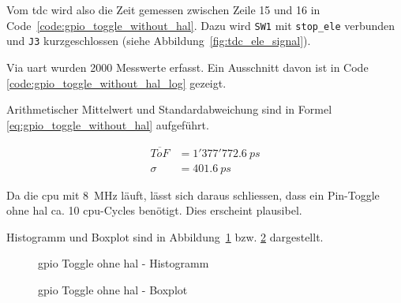 \documentclass[11pt,a4paper,hidelinks]{article}
\begin{document}


Vom \acrshort{tdc} wird also die Zeit gemessen zwischen Zeile 15 und 16 in Code~\ref{code:gpio_toggle_without_hal}. Dazu
wird \lstinline|SW1| mit \lstinline|stop_ele| verbunden und \lstinline|J3| kurzgeschlossen
(siehe Abbildung~\ref{fig:tdc_ele_signal}).

Via \acrshort{uart} wurden 2000 Messwerte erfasst. Ein Ausschnitt davon ist in Code
\ref{code:gpio_toggle_without_hal_log} gezeigt.



Arithmetischer Mittelwert und Standardabweichung sind in Formel \ref{eq:gpio_toggle_without_hal} aufgeführt.

\begin{equation}\label{eq:gpio_toggle_without_hal}
    \begin{split}
        \overline{ToF} &= 1'377'772.6~ps\\
        \sigma         &= 401.6~ps
    \end{split}
\end{equation}

Da die \acrshort{cpu} mit 8~MHz läuft, lässt sich daraus schliessen, dass ein Pin-Toggle ohne \acrshort{hal} ca. 10
\acrshort{cpu}-Cycles benötigt. Dies erscheint plausibel.

Histogramm und Boxplot sind in Abbildung~\ref{fig:gpio_toggle_without_hal_histogram} bzw.
\ref{fig:gpio_toggle_without_hal_boxplot} dargestellt.

\begin{figure}[H]
    \centering
    
    \caption{\acrshort{gpio} Toggle ohne \acrshort{hal} - Histogramm}\label{fig:gpio_toggle_without_hal_histogram}
\end{figure}

\begin{figure}[H]
    \centering
    
    \caption{\acrshort{gpio} Toggle ohne \acrshort{hal} - Boxplot}\label{fig:gpio_toggle_without_hal_boxplot}
\end{figure}
\end{document}
